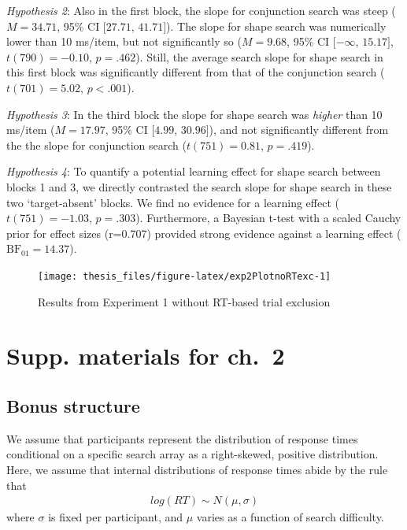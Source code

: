 \documentclass[12pt,twoside]{reedthesis}
\begin{document}
\emph{Hypothesis 2}: Also in the first block, the slope for conjunction search was steep (\(M = 34.71\), 95\% CI \([27.71\), \(41.71]\)). The slope for shape search was numerically lower than 10 ms/item, but not significantly so (\(M = 9.68\), 95\% CI \([-\infty\), \(15.17]\), \(t(790) = -0.10\), \(p = .462\)). Still, the average search slope for shape search in this first block was significantly different from that of the conjunction search (\(t(701) = 5.02\), \(p < .001\)).

\emph{Hypothesis 3}: In the third block the slope for shape search was \emph{higher} than 10 ms/item (\(M = 17.97\), 95\% CI \([4.99\), \(30.96]\)), and not significantly different from the the slope for conjunction search (\(t(751) = 0.81\), \(p = .419\)).

\emph{Hypothesis 4}: To quantify a potential learning effect for shape search between blocks 1 and 3, we directly contrasted the search slope for shape search in these two `target-absent' blocks. We find no evidence for a learning effect (\(t(751) = -1.03\), \(p = .303\)). Furthermore, a Bayesian t-test with a scaled Cauchy prior for effect sizes (r=0.707) provided strong evidence against a learning effect (\(\mathrm{BF}_{\textrm{01}} = 14.37\)).
\begin{figure}
\texttt{[image: thesis\_files/figure-latex/exp2PlotnoRTexc-1]} \caption{Results from Experiment 1 without RT-based trial exclusion}\label{fig:exp2PlotnoRTexc}
\end{figure}
\hypertarget{supp.-materials-for-ch.-2}{%
\chapter{Supp. materials for ch.~2}\label{supp.-materials-for-ch.-2}}

\hypertarget{app2:bonus}{%
\section{Bonus structure}\label{app2:bonus}}

We assume that participants represent the distribution of response times conditional on a specific search array as a right-skewed, positive distribution. Here, we assume that internal distributions of response times abide by the rule that
\begin{align}
    log(RT) \sim N(\mu, \sigma)
\end{align}
where \(\sigma\) is fixed per participant, and \(\mu\) varies as a function of search difficulty.
\end{document}
